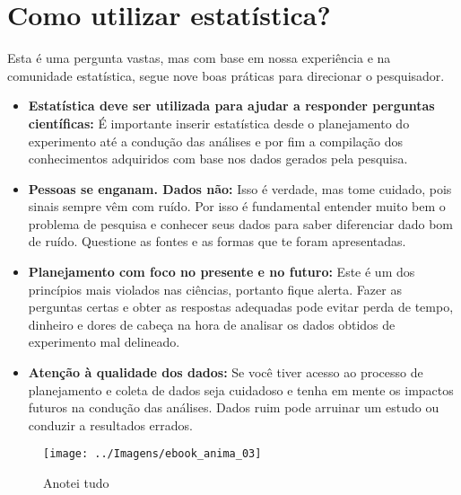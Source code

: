 \documentclass[12pt,]{style/krantz}
\theoremstyle{definition}
\theoremstyle{definition}
\theoremstyle{definition}
\theoremstyle{remark}
\begin{document}
\section{Como utilizar estatística?}\label{como-utilizar-estatistica}

Esta é uma pergunta vastas, mas com base em nossa experiência e na
comunidade estatística, segue nove boas práticas para direcionar o
pesquisador.

\begin{itemize}
\item
  \textbf{Estatística deve ser utilizada para ajudar a responder
  perguntas científicas:} É importante inserir estatística desde o
  planejamento do experimento até a condução das análises e por fim a
  compilação dos conhecimentos adquiridos com base nos dados gerados
  pela pesquisa.
\item
  \textbf{Pessoas se enganam. Dados não:} Isso é verdade, mas tome
  cuidado, pois sinais sempre vêm com ruído. Por isso é fundamental
  entender muito bem o problema de pesquisa e conhecer seus dados para
  saber diferenciar dado bom de ruído. Questione as fontes e as formas
  que te foram apresentadas.
\item
  \textbf{Planejamento com foco no presente e no futuro:} Este é um dos
  princípios mais violados nas ciências, portanto fique alerta. Fazer as
  perguntas certas e obter as respostas adequadas pode evitar perda de
  tempo, dinheiro e dores de cabeça na hora de analisar os dados obtidos
  de experimento mal delineado.
\item
  \textbf{Atenção à qualidade dos dados:} Se você tiver acesso ao
  processo de planejamento e coleta de dados seja cuidadoso e tenha em
  mente os impactos futuros na condução das análises. Dados ruim pode
  arruinar um estudo ou conduzir a resultados errados.
\end{itemize}

\begin{figure}[H]

{\centering \texttt{[image: ../Imagens/ebook\_anima\_03]} 

}

\caption{Anotei tudo}\label{fig:fig03}
\end{figure}
\end{document}
